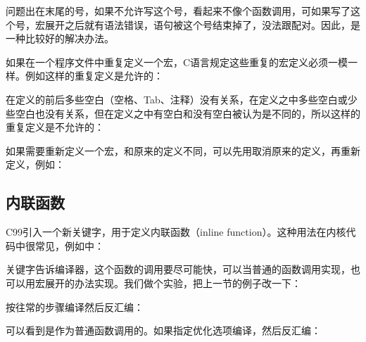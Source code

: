 问题出在末尾的\BookCode{;\BookSplit{}}号，如果不允许写这个\BookCode{;\BookSplit{}}号，看起来不像个函数调用，可如果写了这个\BookCode{;\BookSplit{}}号，宏展开之后就有语法错误，语句被这个\BookCode{;\BookSplit{}}号结束掉了，没法跟配对。因此，是一种比较好的解决办法。



如果在一个程序文件中重复定义一个宏，C语言规定这些重复的宏定义必须一模一样。例如这样的重复定义是允许的：




在定义的前后多些空白（空格、Tab、注释）没有关系，在定义之中多些空白或少些空白也没有关系，但在定义之中有空白和没有空白被认为是不同的，所以这样的重复定义是不允许的：




如果需要重新定义一个宏，和原来的定义不同，可以先用取消原来的定义，再重新定义，例如：



\subsection{内联函数}
%


C99引入一个新关键字，用于定义内联函数（inline function）。这种用法在内核代码中很常见，例如中：




关键字告诉编译器，这个函数的调用要尽可能快，可以当普通的函数调用实现，也可以用宏展开的办法实现。我们做个实验，把上一节的例子改一下：





按往常的步骤编译然后反汇编：




可以看到是作为普通函数调用的。如果指定优化选项编译，然后反汇编：


